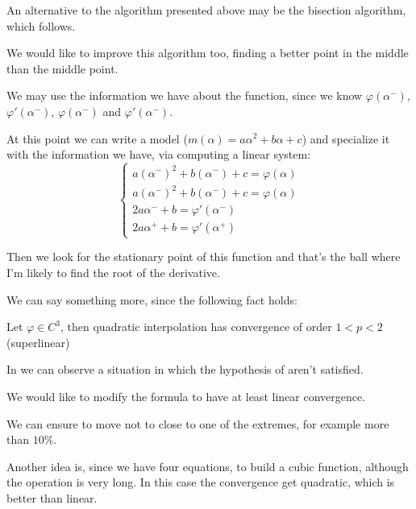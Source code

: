 \documentclass[computational_mathematics.tex]{subfiles}
\begin{document}
An alternative to the algorithm presented above may be the bisection algorithm, which follows.



We would like to improve this algorithm too, finding a better point in the middle than the middle point.


We may use the information we have about the function, since we know $\varphi(\alpha^{-})$, $\varphi ' (\alpha^{-})$, $\varphi(\alpha^{-})$ and $\varphi ' (\alpha^{-})$.

At this point we can write a model ($m(\alpha) = a {\alpha}^{2} + b \alpha + c$) and specialize it with the information we have, via computing a linear system:
\[
\begin{cases}
  a {(\alpha^{-})}^{2} + b (\alpha^{-}) + c = \varphi(\alpha)\\
  a {(\alpha^{-})}^{2} + b (\alpha^{-}) + c = \varphi(\alpha)\\
  2a \alpha^{-} + b = \varphi'(\alpha^{-})\\
  2a \alpha^{+} + b = \varphi'(\alpha^{+})
\end{cases}
\]

Then we look for the stationary point of this function and that's the ball where I'm likely to find the root of the derivative.

We can say something more, since the following fact holds:

\begin{proposition}\label{fact:24ott3}
Let $\varphi \in C^{{3}}$, then quadratic interpolation has convergence of order $1 < p < 2$ (superlinear)
\end{proposition}

In  we can observe a situation in which the hypothesis of  aren't satisfied.


We would like to modify the formula to have at least linear convergence.

We can ensure to move not to close to one of the extremes, for example more than $10\%$.

Another idea is, since we have four equations, to build a cubic function, although the operation is very long. In this case the convergence get quadratic, which is better than linear.
\end{document}
